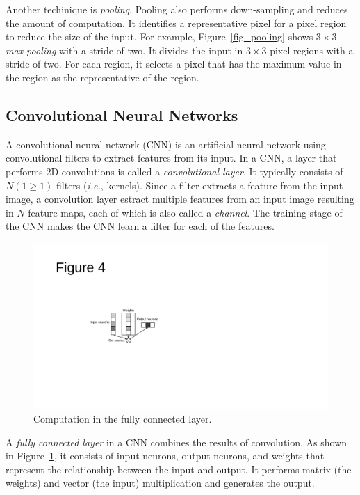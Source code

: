 Another techinique is \textit{pooling}. Pooling also performs down-sampling and reduces the amount of computation. It identifies a representative pixel for a pixel region to reduce the size of the input. For example, Figure~\ref{fig_pooling} shows $3 \times 3$ \textit{max pooling} with a stride of two. It divides the input in $3 \times 3$-pixel regions with a stride of two. For each region, it selects a pixel that has the maximum value in the region as the representative of the region. 

\subsection{Convolutional Neural Networks}
\label{sec:CNN}
A convolutional neural network (CNN) is an artificial neural network using convolutional filters to extract features from its input. In a CNN, a layer that performs 2D convolutions is called a \textit{convolutional layer}. It typically consists of $N (1 \geq 1)$ filters (\textit{i.e.}, kernels). Since a filter extracts a feature from the input image, a convolution layer estract multiple features from an input image resulting in $N$ feature maps, each of which is also called a \textit{channel}. The training stage of the CNN makes the CNN learn a filter for each of the features.

\begin{figure}[htbp]
  \centering
  \includegraphics[width=0.5\linewidth]{./figures/fully}
  \caption{Computation in the fully connected layer. }
  \label{fig_fully}
\end{figure}

A \textit{fully connected layer} in a CNN combines the results of convolution. As shown in Figure~\ref{fig_fully}, it consists of input neurons, output neurons, and weights that represent the relationship between the input and output. It performs matrix (the weights) and vector (the input) multiplication and generates the output.


